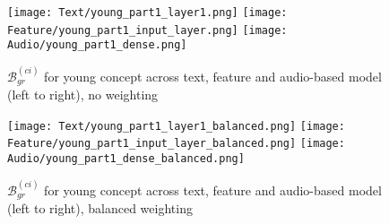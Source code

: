 \begin{figure}[H]
    \centering
    \begin{minipage}[t]{0.48\textwidth}
        \centering
        \texttt{[image: Text/young\_part1\_layer1.png]}
        \hfill
        \texttt{[image: Feature/young\_part1\_input\_layer.png]}
        \texttt{[image: Audio/young\_part1\_dense.png]}
        \caption{$\mathcal{B}^{(ci)}_{gr}$ for young concept across text, feature and audio-based model (left to right), no weighting}
        \label{fig:grad_young}
    \end{minipage}
    \hfill
    \begin{minipage}[t]{0.48\textwidth}
        \centering
        \texttt{[image: Text/young\_part1\_layer1\_balanced.png]}
        \hfill
        \texttt{[image: Feature/young\_part1\_input\_layer\_balanced.png]}
        \texttt{[image: Audio/young\_part1\_dense\_balanced.png]}
        \caption{$\mathcal{B}^{(ci)}_{gr}$ for young concept across text, feature and audio-based model (left to right), balanced weighting}
        \label{fig:grad_young_balanced}
    \end{minipage}
\end{figure}


